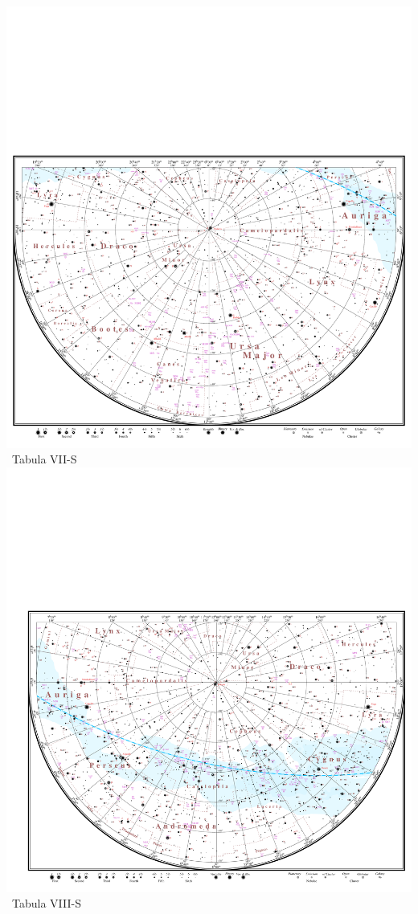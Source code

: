 \documentclass[10pt,landscape,oneside]{article}
\begin{document}
\begin{center}
\noindent\includegraphics[height=\textheight,trim= 0.0cm 0.0cm 0.0cm 14.35cm,clip]{TabulaII.pdf}\\[-1.025\textheight]\hfill\large~Tabula VII-S\hspace{15mm}
\clearpage
%
\noindent\includegraphics[height=\textheight,trim= 0.0cm 0.0cm 0.0cm 14.35cm,clip]{TabulaI.pdf}\\[-1.025\textheight]\hfill\large~Tabula VIII-S\hspace{7mm}
\clearpage
\end{center}
\end{document}

